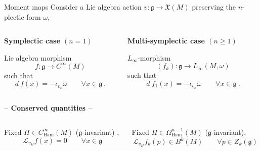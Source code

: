 \documentclass[handout,10pt]{beamer}
\begin{document}
\begin{frame}{Moment maps}
	Consider a Lie algebra action $v:\mathfrak{g} \to \mathfrak{X}(M)$  preserving the $n$-plectic form $\omega$,
	\vfill
	\begin{columns}
		\begin{column}{.5\linewidth}	
	\textbf{Symplectic case $(n=1)$}
		\begin{defblock}
			Lie algebra morphism
			$$ f: \mathfrak{g} \to C^\infty(M) $$
			such that
			$$ d~f (x) = -\iota_{v_x} \omega \qquad\scriptstyle \forall x \in \mathfrak{g}~.$$
		\end{defblock}		
		\end{column}
		\begin{column}{.5\linewidth}
	\pause
	\textbf{Multi-symplectic case $(n\geq 1)$}
		\begin{defblock}%
			$L_\infty$-morphism 
			$$ (f_k) : \mathfrak{g} \to L_\infty (M,\omega)$$
			such that
			$$ d~f_1(x) = -\iota_{v_x} \omega \qquad \scriptstyle\forall x \in \mathfrak{g}~.$$
		\end{defblock}		
		\end{column}
	\end{columns}	
	\pause
	\vfill
	\centering \textbf{-- Conserved quantities --}
	\begin{columns}
		\begin{column}{.5\linewidth}		
			\begin{propblock}
				\small Fixed $H\in C^\infty_{\text{Ham}}(M)$ ($\mathfrak{g}$-invariant) ,
				$$\mathcal{L}_{v_H} f(x) = 0 \qquad \scriptstyle \forall x \in \mathfrak{g}$$
			\end{propblock}
		\end{column}
	\pause
		\begin{column}{.5\linewidth}			
			\begin{propblock}%
				\small Fixed $H\in \Omega^{n-1}_{\text{Ham}}(M)$ ($\mathfrak{g}$-invariant),
				$$\mathcal{L}_{v_H} f_k(p) \in B^k(M) \qquad \scriptstyle \forall p \in Z_k(\mathfrak{g})$$			
			\end{propblock}
		\end{column}
	\end{columns}



\end{frame}
\end{document}
